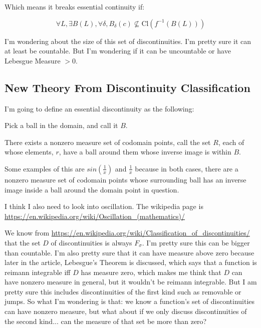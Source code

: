 \documentclass{article}
\begin{document}
Which means it breaks essential continuity if: 

$$\forall L, \exists B(L), \forall \delta, B_\delta (c) \nsubseteq  \textrm{Cl}(f^{-1}(B(L)))$$

I'm wondering about the size of this set of discontinuities. I'm pretty sure it can at least be countable. But I'm wondering if it can be uncountable or have Lebesgue Measure $> 0$.

\subsection{New Theory From Discontinuity Classification}

I'm going to define an essential discontinuity as the following:

Pick a ball in the domain, and call it $B$.

There exists a nonzero measure set of codomain points, call the set $R$, each of whose elements, $r$, have a ball around them whose inverse image is within $B$.

Some examples of this are $sin(\frac{1}{x})$ and $\frac{1}{x}$ because in both cases, there are a nonzero measure set of codomain points whose surrounding ball has an inverse image inside a ball around the domain point in question.

I think I also need to look into oscillation. The wikipedia page is \url{https://en.wikipedia.org/wiki/Oscillation_(mathematics)/}

We know from \url{https://en.wikipedia.org/wiki/Classification_of_discontinuities/} that the set $D$ of discontinuities is always $F_\sigma$.  I'm pretty sure this can be bigger than countable.  I'm also pretty sure that it can have measure above zero because later in the article, Lebesgue's Theorem is discussed, which says that a function is reimann integrable iff $D$ has measure zero, which makes me think that $D$ can have nonzero measure in general, but it wouldn't be reimann integrable.  But I am pretty sure this includes discontinuities of the first kind such as removable or jumps.  So what I'm wondering is that: we know a function's set of discontinuities can have nonzero measure, but what about if we only discuss discontinuities of the second kind... can the measure of that set be more than zero?
\end{document}

